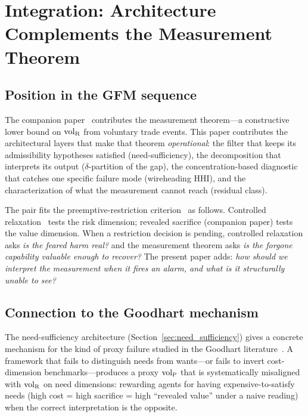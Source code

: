 \section{Integration: Architecture Complements the Measurement Theorem}
\label{sec:integration}

\subsection{Position in the GFM sequence}

The companion paper~\citep[Revealed~Sacrifice]{lasser2026paper8a} contributes the
measurement theorem---a constructive lower bound on ${\operatorname{vol}_{\mathrm{R}}}$
from voluntary trade events.  This paper contributes the
architectural layers that make that theorem \emph{operational}:
the filter that keeps its admissibility hypotheses satisfied
(need-sufficiency), the decomposition that interprets its
output ($\delta$-partition of the gap), the concentration-based
diagnostic that catches one specific failure mode (wireheading
HHI), and the characterization of what the measurement cannot
reach (residual class).

The pair fits the preemptive-restriction
criterion~\citep[Proposition~1]{lasser2026horizon} as follows.
Controlled relaxation~\citep[Controlled~Relaxation]{lasser2026wamura} tests the risk
dimension; revealed sacrifice (companion paper) tests the value
dimension.  When a restriction decision is pending, controlled
relaxation asks \emph{is the feared harm real?} and the
measurement theorem asks \emph{is the forgone capability
valuable enough to recover?}  The present paper adds: \emph{how
should we interpret the measurement when it fires an alarm, and
what is it structurally unable to see?}

\subsection{Connection to the Goodhart mechanism}

The need-sufficiency architecture
(Section~\ref{sec:need_sufficiency}) gives a concrete mechanism
for the kind of proxy failure studied in the Goodhart
literature~\citep{strathern1997improving,manheim2019categorizing}.
A framework that fails to distinguish needs from wants---or
fails to invert cost-dimension benchmarks---produces a proxy
${\operatorname{vol}_{\mathrm{P}}}$ that is systematically misaligned with ${\operatorname{vol}_{\mathrm{R}}}$ on need
dimensions: rewarding agents for having expensive-to-satisfy
needs (high cost = high sacrifice = high ``revealed value''
under a naive reading) when the correct interpretation is the
opposite.


